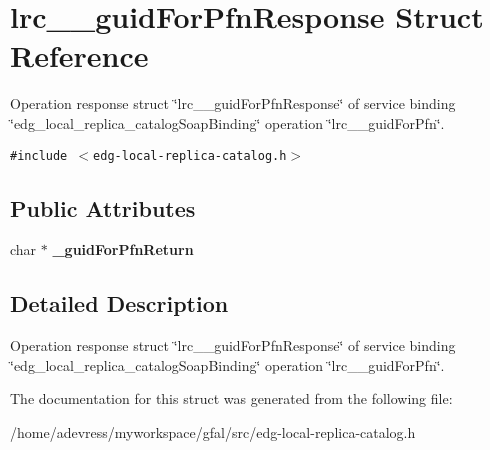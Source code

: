 \section{lrc\_\-\_\-guid\-For\-Pfn\-Response Struct Reference}
\label{structlrc____guidForPfnResponse}
Operation response struct \char`\"{}lrc\_\-\_\-guid\-For\-Pfn\-Response\char`\"{} of service binding \char`\"{}edg\_\-local\_\-replica\_\-catalog\-Soap\-Binding\char`\"{} operation \char`\"{}lrc\_\-\_\-guid\-For\-Pfn\char`\"{}.  


{\tt \#include $<$edg-local-replica-catalog.h$>$}

\subsection*{Public Attributes}
\begin{CompactItemize}
\item 
char $\ast$ \textbf{\_\-guid\-For\-Pfn\-Return}\label{structlrc____guidForPfnResponse_60110924bd2cd9f0a21c249ff2bc6bbf}

\end{CompactItemize}


\subsection{Detailed Description}
Operation response struct \char`\"{}lrc\_\-\_\-guid\-For\-Pfn\-Response\char`\"{} of service binding \char`\"{}edg\_\-local\_\-replica\_\-catalog\-Soap\-Binding\char`\"{} operation \char`\"{}lrc\_\-\_\-guid\-For\-Pfn\char`\"{}. 



The documentation for this struct was generated from the following file:\begin{CompactItemize}
\item 
/home/adevress/myworkspace/gfal/src/edg-local-replica-catalog.h\end{CompactItemize}
